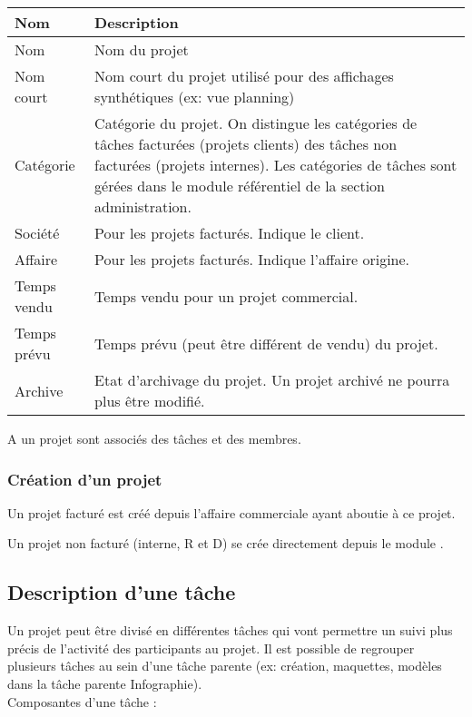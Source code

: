 \begin{tabular}{|p{3cm}|p{10cm}|}
\hline
\textbf{Nom} & \textbf{Description} \\
\hline
Nom & Nom du projet \\
\hline
Nom court & Nom court du projet utilisé pour des affichages synthétiques (ex: vue planning)\\
\hline
Catégorie & Catégorie du projet. On distingue les catégories de tâches facturées (projets clients) des tâches non facturées (projets internes). Les catégories de tâches sont gérées dans le module référentiel de la section administration.\\
\hline
Société & Pour les projets facturés. Indique le client.\\
\hline
Affaire & Pour les projets facturés. Indique l'affaire origine.\\
\hline
Temps vendu & Temps vendu pour un projet commercial.\\
\hline
Temps prévu & Temps prévu (peut être différent de vendu) du projet.\\
\hline
Archive & Etat d'archivage du projet. Un projet archivé ne pourra plus être modifié.\\
\hline
\end{tabular}
\vspace{0.3cm}

A un projet sont associés des tâches et des membres.


\subsubsection{Création d'un projet}
Un projet facturé est créé depuis l'affaire commerciale ayant aboutie à ce projet.

Un projet non facturé (interne, R et D) se crée directement depuis le module \project.

\subsection{Description d'une tâche}

Un projet peut être divisé en différentes tâches qui vont permettre un suivi plus précis de l'activité des participants au projet. Il est possible de regrouper plusieurs tâches au sein d'une tâche parente (ex: création, maquettes, modèles dans la tâche parente Infographie).\\

Composantes d'une tâche :\\

